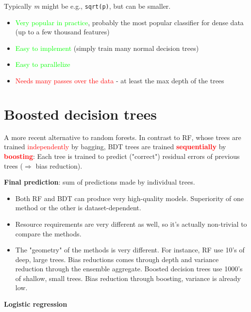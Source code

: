 \documentclass[11pt]{article}
\begin{document}
Typically \textit{m} might be e.g., \verb|sqrt(p)|, but can be smaller. 

\begin{itemize}
	\item \textcolor{lime}{Very popular in practice}, probably the most popular classifier for dense data (up to a few thousand features)
	\item \textcolor{lime}{Easy to implement} (simply train many normal decision trees)
	\item \textcolor{lime}{Easy to parallelize}
\end{itemize}

\begin{itemize}
	\item \textcolor{red}{Needs many passes over the data} - at least the max depth of the trees
\end{itemize}

\section*{Boosted decision trees}

A more recent alternative to random forests. In contrast to RF, whose trees are trained \textcolor{red}{independently} by bagging, BDT trees are trained \textbf{\textcolor{red}{sequentially}} by \textbf{\textcolor{red}{boosting}}: Each tree is trained to predict ("correct") residual errors of previous trees ($\Rightarrow$ bias reduction).

\textbf{Final prediction}: sum of predictions made by individual trees. 

\begin{itemize}
	\item Both RF and BDT can produce very high-quality models. Superiority of one method or the other is dataset-dependent. 
	\item Resource requirements are very different as well, so it's actually non-trivial to compare the methods.
	\item The "geometry" of the methods is very different. For instance, RF use 10's of deep, large trees. Bias reductions comes through depth and variance reduction through the ensemble aggregate. Boosted decision trees use 1000's of shallow, small trees. Bias reduction through boosting, variance is already low. 
\end{itemize}

\vspace{0.5cm}

\begin{center}
  {\LARGE \textbf{Logistic regression}}
\end{center}
\vspace{0.5cm}
\end{document}

